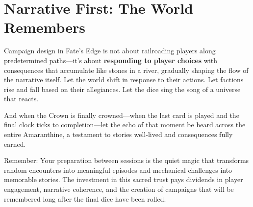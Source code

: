 \section*{Narrative First: The World Remembers}

Campaign design in Fate's Edge is not about railroading players along predetermined paths---it's about \textbf{responding to player choices} with consequences that accumulate like stones in a river, gradually shaping the flow of the narrative itself. Let the world shift in response to their actions. Let factions rise and fall based on their allegiances. Let the dice sing the song of a universe that reacts.

And when the Crown is finally crowned---when the last card is played and the final clock ticks to completion---let the echo of that moment be heard across the entire Amaranthine, a testament to stories well-lived and consequences fully earned.

Remember: Your preparation between sessions is the quiet magic that transforms random encounters into meaningful episodes and mechanical challenges into memorable stories. The investment in this sacred trust pays dividends in player engagement, narrative coherence, and the creation of campaigns that will be remembered long after the final dice have been rolled.


